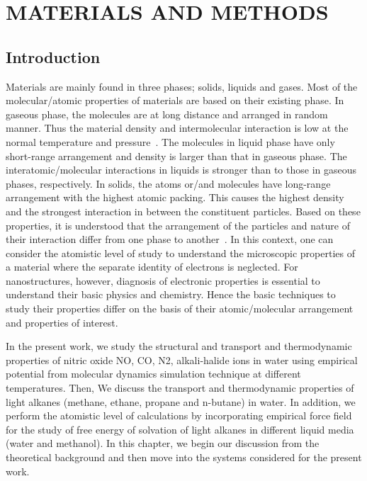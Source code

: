 \chapter{MATERIALS AND METHODS} \label{chap:3}
\def\etal{{\it et al.}\/}
\section{Introduction}
\begin{sloppypar}
Materials are mainly found in three phases; solids, liquids and gases. Most of the molecular/atomic properties of materials are based on their existing phase. In gaseous phase, the molecules are at long distance and arranged in random manner. Thus the material density and intermolecular interaction is low at the normal temperature and pressure~\citep{Frenkel2002}. The molecules in liquid phase have only short-range arrangement 
and density is larger than that in gaseous phase. The interatomic/molecular interactions in liquids is stronger than to those in gaseous phases, respectively. In solids, the atoms or/and molecules have long-range arrangement with the highest atomic packing. This causes the highest density and the strongest interaction in between the constituent particles. Based on these properties, it is understood that the arrangement of the particles and nature of their interaction differ from one phase to another~\citep{Hansen2006}.  In this context, one can consider the atomistic level of study to understand the microscopic properties of a material where the separate identity of electrons is neglected. For nanostructures, however, diagnosis of electronic properties is essential to understand their basic physics and chemistry. Hence the basic techniques to study their properties differ on the basis of their atomic/molecular arrangement and properties of interest.
\end{sloppypar}

In the present work, we study the structural and transport and thermodynamic properties of  nitric oxide NO, CO, N2, alkali-halide ions in water  using empirical potential from molecular dynamics simulation technique at different temperatures. Then, We discuss the transport and thermodynamic properties of light alkanes (methane, ethane, propane and n-butane) in water. In addition, we perform  the atomistic level of calculations by incorporating empirical force field for the study of free energy of solvation of light alkanes in different liquid media (water and  methanol). In this chapter, we begin our discussion from the theoretical background and then move into the systems considered for the present work. 


